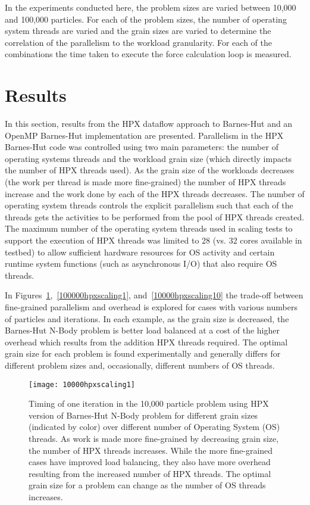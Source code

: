 \documentclass[floatfix]{revtex4}
\begin{document}
In the experiments conducted here, the problem sizes are varied between 10,000
and 100,000 particles. For each of the problem sizes, the number of operating system threads 
are varied and the grain sizes are varied to determine the correlation of the parallelism to 
the workload granularity. For each of the combinations the time taken to execute the force calculation 
loop is measured. 

\section{Results}
\label{results}

In this section, results from the HPX dataflow approach to Barnes-Hut and an OpenMP Barnes-Hut implementation 
are presented. Parallelism in the HPX Barnes-Hut code
was controlled using two main parameters: the number of operating systems threads and the
workload grain size (which directly impacts the number of HPX threads used). As the grain size
of the workloads decreases (the work per thread is made more fine-grained) the number of HPX threads 
increase and the work done by each of the HPX threads decreases. The number of operating system threads 
controls the explicit parallelism
such that each of the threads gets the activities to be performed from the pool of HPX threads created.
The maximum number of the operating system threads used in scaling tests to 
support the execution of HPX threads was limited to 28 (vs. 32 cores 
available in testbed) to allow sufficient hardware resources for OS 
activity and certain runtime system functions (such as asynchronous I/O) 
that also require OS threads.

In Figures~\ref{10000hpxscaling1},~\ref{100000hpxscaling1}, and~\ref{10000hpxscaling10} the trade-off between fine-grained 
parallelism and overhead is explored for cases with various numbers of particles and iterations. In each
example, as the grain size is decreased, the Barnes-Hut N-Body problem is better load balanced 
at a cost of the higher overhead
which results from the addition HPX threads required. The optimal grain size for each problem is found experimentally
and generally differs for different problem sizes and, occasionally, different numbers of OS threads. 

 \begin{figure}[htp]
\centering
\texttt{[image: 10000hpxscaling1]}
\caption{Timing of one iteration in the 10,000 particle problem using HPX version of Barnes-Hut N-Body problem
for different grain sizes (indicated by color) over different number of Operating System (OS) threads. As work is made
more fine-grained by decreasing grain size, the number of HPX threads increases. 
While the more fine-grained cases have improved load balancing, they also have more overhead resulting from the
increased number of HPX threads. The optimal grain size for a problem can change as the number of OS threads
increases.}
\label{10000hpxscaling1}\end{figure}
\end{document}
